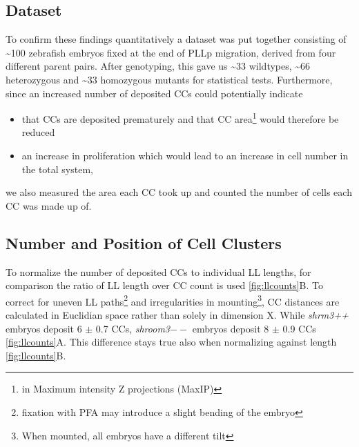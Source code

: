 \documentclass[11pt,singlespacinge,twoside]{reedthesis} %
\providecommand{\tightlist}{%
  \setlength{\itemsep}{0pt}\setlength{\parskip}{0pt}}
\begin{document}
\hypertarget{dataset}{%
\subsection{Dataset}\label{dataset}}

To confirm these findings quantitatively a dataset was put together consisting of \textasciitilde{}100 zebrafish embryos fixed at the end of PLLp migration, derived from four different parent pairs. After genotyping, this gave us \textasciitilde{}33 wildtypes, \textasciitilde{}66 heterozygous and \textasciitilde{}33 homozygous mutants for statistical tests. Furthermore, since an increased number of deposited CCs could potentially indicate
\begin{itemize}
\tightlist
\item
  that CCs are deposited prematurely and that CC area\footnote{in Maximum intensity Z projections (MaxIP)} would therefore be reduced
\item
  an increase in proliferation which would lead to an increase in cell number in the total system,
\end{itemize}
we also measured the area each CC took up and counted the number of cells each CC was made up of.

\hypertarget{res-ccounts}{%
\subsection{Number and Position of Cell Clusters}\label{res-ccounts}}

To normalize the number of deposited CCs to individual LL lengths, for comparison the ratio of LL length over CC count is used \ref{fig:llcounts}B. To correct for uneven LL paths\footnote{fixation with PFA may introduce a slight bending of the embryo} and irregularities in mounting\footnote{When mounted, all embryos have a different tilt}, CC distances are calculated in Euclidian space rather than solely in dimension X. While \emph{shrm3++} embryos deposit 6 \(\pm\) 0.7 CCs, \emph{shroom3}\(--\) embryos deposit 8 \(\pm\) 0.9 CCs \ref{fig:llcounts}A. This difference stays true also when normalizing against length \ref{fig:llcounts}B.
\end{document}
